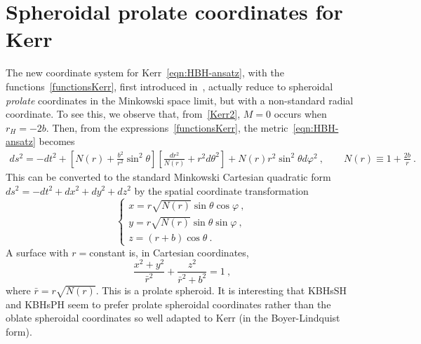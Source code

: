 \chapter{Spheroidal prolate coordinates for Kerr}
\label{prolatecoordinates}
The new coordinate system for Kerr~\eqref{eqn:HBH-ansatz}, with the functions~\eqref{functionsKerr}, first introduced in~\cite{Herdeiro:2015gia}, actually reduce to spheroidal \textit{prolate} coordinates in the Minkowski space limit, but with a non-standard radial coordinate. To see this, we observe that, from~\eqref{Kerr2}, $M=0$ occurs when $r_H=-2b$. Then, from the expressions~\eqref{functionsKerr}, the metric~\eqref{eqn:HBH-ansatz} becomes
\begin{eqnarray}
ds^2=-dt^2+\left[N(r)+\frac{b^2}{r^2}\sin^2\theta\right]\left[\frac{dr^2}{N(r)}+r^2d\theta^2\right]
+N(r)r^2\sin^2\theta d\varphi^2 \ , \qquad N(r)\equiv 1+\frac{2b}{r} \ .
\end{eqnarray}
This can be converted to the standard Minkowski Cartesian quadratic form $ds^2=-dt^2+dx^2+dy^2+dz^2$ by the spatial coordinate transformation
\begin{equation}
\left\{
\begin{array}{l}
x=r\sqrt{N(r)}\sin\theta\cos\varphi \ , \\
y=r\sqrt{N(r)}\sin\theta\sin\varphi \ , \\
z=(r+b)\cos\theta \ .
\end{array}
\right.
\end{equation}
A surface with $r=$constant is, in Cartesian coordinates,
\begin{equation}
\frac{x^2+y^2}{\bar{r}^2}+\frac{z^2}{\bar{r}^2+b^2}=1 \ ,
\end{equation}
where $\bar{r}=r\sqrt{N(r)}$. This is a prolate spheroid. It is interesting that KBHsSH and KBHsPH seem to prefer prolate spheroidal coordinates rather than the oblate spheroidal coordinates so well adapted to Kerr (in the Boyer-Lindquist form).
